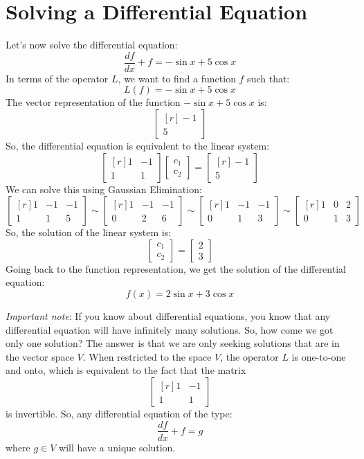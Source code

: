 \documentclass[12pt]{article}
\begin{document}
\section{Solving a Differential Equation}
Let's now solve the differential equation:
\[
\frac{df}{dx}+f=-\sin x + 5\cos x
\]
In terms of the operator $L$, we want to find a function $f$ such that:
\[
L(f)=-\sin x + 5\cos x
\]
The vector representation of the function $-\sin x+5\cos x$ is:
\[
\begin{bmatrix*}[r]-1\\5\end{bmatrix*}
\]
So, the differential equation is equivalent to the linear system:
\[
\begin{bmatrix*}[r]1&-1\\1&1\end{bmatrix*}
\begin{bmatrix}c_1\\c_2\end{bmatrix}=
\begin{bmatrix*}[r]-1\\5\end{bmatrix*}
\]
We can solve this using Gaussian Elimination:
\[
\begin{bmatrix*}[r] 1& -1& -1\\ 1& 1& 5\end{bmatrix*}
\sim\begin{bmatrix*}[r] 1& -1& -1\\ 0& 2& 6\end{bmatrix*}
\sim\begin{bmatrix*}[r] 1& -1& -1\\ 0& 1& 3\end{bmatrix*}
\sim\begin{bmatrix*}[r] 1& 0& 2\\ 0& 1& 3\end{bmatrix*}
\]
So, the solution of the linear system is:
\[
\begin{bmatrix}c_1\\c_2\end{bmatrix}=
\begin{bmatrix}2\\3\end{bmatrix}
\]
Going back to the function representation, we get the solution of the differential equation:
\[
f(x)=2\sin x+3\cos x
\]

\emph{Important note}: If you know about differential equations, you know that any differential equation will have infinitely many solutions. So, how come we got only one solution? The answer is that we are only seeking solutions that are in the vector space $V$. When restricted to the space $V$, the operator $L$ is one-to-one and onto, which is equivalent to the fact that the matrix
\[
\begin{bmatrix*}[r]1&-1\\1&1\end{bmatrix*}
\]
is invertible. So, any differential equation of the type:
\[
\frac{df}{dx}+f=g
\]
where $g\in V$ will have a unique solution.
\end{document}
